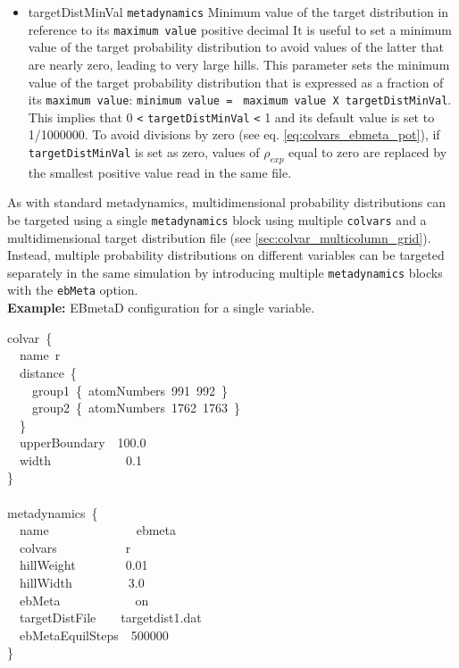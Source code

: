 \begin{itemize}
\item %
  \key
    {targetDistMinVal}{%
    \texttt{metadynamics}}{%
    Minimum value of the target distribution in reference to its \texttt{maximum value}}{%
    positive decimal}{%
    It is useful to set a minimum value of the target probability distribution to avoid values of the latter that are nearly zero, leading to very large hills.
    This parameter sets the minimum value of the target probability distribution that is expressed as a fraction of its \texttt{maximum value}: \texttt{minimum value = }
    \texttt{maximum value}\texttt{ X }\texttt{targetDistMinVal}. This implies that 0 \texttt{<} \texttt{targetDistMinVal} \texttt{<} 1 and its default value is set to 1/1000000.
    To avoid divisions by zero (see eq.{} \ref{eq:colvars_ebmeta_pot}), if \texttt{targetDistMinVal} is set as zero, values of $\rho_{exp}$ equal to zero are replaced by the
    smallest positive value read in the same file.
}

\end{itemize}

As with standard metadynamics, multidimensional probability distributions can be targeted using a single \texttt{metadynamics} block using multiple \texttt{colvars} and a multidimensional target distribution file (see \ref{sec:colvar_multicolumn_grid}).
Instead, multiple probability distributions on different variables can be targeted separately in the same simulation by introducing multiple \texttt{metadynamics} blocks with the \texttt{ebMeta} option.
\\

\noindent\textbf{Example:} EBmetaD configuration for a single variable.
\begin{cvexampleinput}
\-colvar~\{\\
\-\-~~name~r~\\
\-\-~~distance~\{\\
\-\-~~~~group1~\{~atomNumbers~991~992~\}\\
\-\-~~~~group2~\{~atomNumbers~1762~1763~\}\\
\-\-~~\}\\
\-\-~~upperBoundary~~100.0~\\
\-\-~~width~~~~~~~~~~~~0.1~\\
\-\}\\
\\
\-metadynamics~\{\\
\-\-~~name~~~~~~~~~~~~~~ebmeta\\
\-\-~~colvars~~~~~~~~~~~r\\
\-\-~~hillWeight~~~~~~~~0.01\\
\-\-~~hillWidth~~~~~~~~~3.0\\
\-\-~~ebMeta~~~~~~~~~~~~on\\
\-\-~~targetDistFile~~~~targetdist1.dat\\
\-\-~~ebMetaEquilSteps~~500000\\
\-\}
\end{cvexampleinput}


